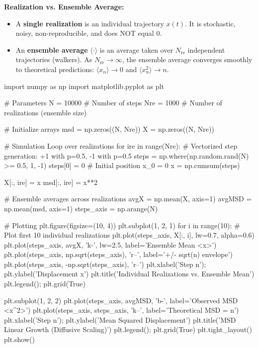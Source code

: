 \documentclass{article}
\begin{document}
\textbf{Realization vs. Ensemble Average:}
\begin{itemize}
    \item A \textbf{single realization} is an individual trajectory $x(t)$. It is stochastic, noisy, non-reproducible, and does NOT equal $0$.
    \item An \textbf{ensemble average} $\langle \cdot \rangle$ is an average taken over $N_{\text{re}}$ independent trajectories (walkers). As $N_{\text{re}} \to \infty$, the ensemble average converges smoothly to theoretical predictions: $\langle x_n \rangle \to 0$ and $\langle x_n^2 \rangle \to n$.
\end{itemize}
\newpage

\begin{jupytercode}
import numpy as np
import matplotlib.pyplot as plt

# Parameters
N = 10000          # Number of steps
Nre = 1000         # Number of realizations (ensemble size)

# Initialize arrays
msd = np.zeros((N, Nre))
X = np.zeros((N, Nre))

# Simulation Loop over realizations
for ire in range(Nre):
    # Vectorized step generation: +1 with p=0.5, -1 with p=0.5
    steps = np.where(np.random.rand(N) >= 0.5, 1, -1)
    steps[0] = 0  # Initial position x_0 = 0
    x = np.cumsum(steps)
    
    X[:, ire] = x
    msd[:, ire] = x**2

# Ensemble averages across realizations
avgX = np.mean(X, axis=1)
avgMSD = np.mean(msd, axis=1)
steps_axis = np.arange(N)

# Plotting
plt.figure(figsize=(10, 4))
plt.subplot(1, 2, 1)
for i in range(10): # Plot first 10 individual realizations
    plt.plot(steps_axis, X[:, i], lw=0.7, alpha=0.6)
plt.plot(steps_axis, avgX, 'k-', lw=2.5, label='Ensemble Mean <x>')
plt.plot(steps_axis, np.sqrt(steps_axis), 'r--', label='+/- sqrt(n) envelope')
plt.plot(steps_axis, -np.sqrt(steps_axis), 'r--')
plt.xlabel('Step n'); plt.ylabel('Displacement x')
plt.title('Individual Realizations vs. Ensemble Mean')
plt.legend(); plt.grid(True)

plt.subplot(1, 2, 2)
plt.plot(steps_axis, avgMSD, 'b-', label='Observed MSD <x^2>')
plt.plot(steps_axis, steps_axis, 'k--', label='Theoretical MSD = n')
plt.xlabel('Step n'); plt.ylabel('Mean Squared Displacement')
plt.title('MSD Linear Growth (Diffusive Scaling)')
plt.legend(); plt.grid(True)
plt.tight_layout()
plt.show()
\end{jupytercode}
\newpage
\end{document}
